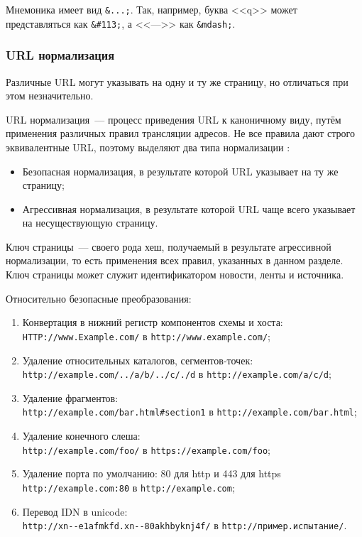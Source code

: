 Мнемоника имеет вид \verb|&...;|. Так, например, буква <<q>> может представляться как \verb|&#113;|, а <<--->> как \verb|&mdash;|.

\subsubsection{URL нормализация} \label{sssec:url-normalization}
Различные URL могут указывать на одну и ту же страницу, но отличаться при этом незначительно.

URL нормализация~--- процесс приведения URL к каноничному виду, путём применения различных правил трансляции адресов. Не все правила дают строго эквивалентные URL, поэтому выделяют два типа нормализации \cite{pant04}:
\begin{itemize}
    \item Безопасная нормализация, в результате которой URL указывает на ту же страницу;
    \item Агрессивная нормализация, в результате которой URL чаще всего указывает на несуществующую страницу.
\end{itemize}

Ключ страницы~--- своего рода хеш, получаемый в результате агрессивной нормализации, то есть применения всех правил, указанных в данном разделе. Ключ страницы может служит идентификатором новости, ленты и источника.

Относительно безопасные преобразования:
\begin{enumerate}
    \item Конвертация в нижний регистр компонентов схемы и хоста: \\ \verb|HTTP://www.Example.com/| в \verb|http://www.example.com/|;
    \item Удаление относительных каталогов, сегментов-точек: \\ \verb|http://example.com/../a/b/../c/./d| в \verb|http://example.com/a/c/d|;
    \item Удаление фрагментов: \\ \verb|http://example.com/bar.html#section1| в \verb|http://example.com/bar.html|;
    \item Удаление конечного слеша: \\ \verb|http://example.com/foo/| в \verb|https://example.com/foo|;
    \item Удаление порта по умолчанию: 80 для http и 443 для https \\ \verb|http://example.com:80| в \verb|http://example.com|;
    \item Перевод IDN в unicode: \\ \verb|http://xn--e1afmkfd.xn--80akhbyknj4f/| в \verb|http://пример.испытание/|.
\end{enumerate}

